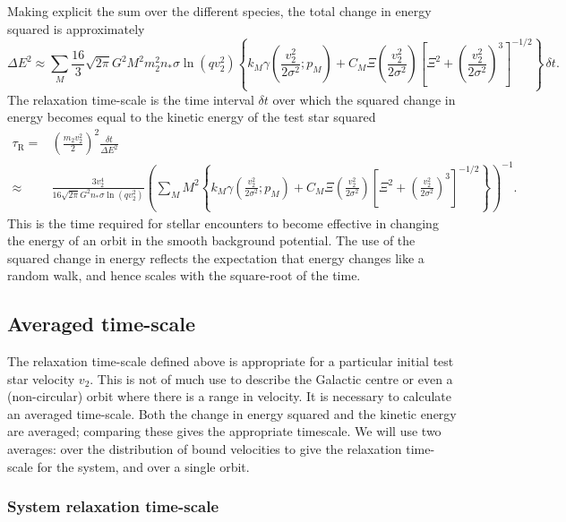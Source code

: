 \documentclass[useAMS,usedcolumn,usegraphicx,usenatbib]{mn2e}
\newcommand{\sub}[1]{\ensuremath{_\mathrm{#1}}}
\begin{document}
\begin{onecolumn}
Making explicit the sum over the different species, the total change in energy squared is approximately
\begin{equation}
\Delta E^2 \approx \sum_M \frac{16}{3}\sqrt{2\pi}G^2 M^2m_2^2n_\ast\sigma\ln\left(qv_2^2\right) \left\{k_M \gamma\left(\frac{v_2^2}{2\sigma^2};p_M\right) + C_M\Xi\left(\frac{v_2^2}{2\sigma^2}\right)\left[\Xi^2 + \left(\frac{v_2^2}{2\sigma^2}\right)^3\right]^{-1/2}\right\}\,\delta t.
\end{equation}
The relaxation time-scale is the time interval $\delta t$ over which the squared change in energy becomes equal to the kinetic energy of the test star squared
\begin{align}
\tau\sub{R} = {} & \left(\frac{m_2v_2^2}{2}\right)^2\frac{\delta t}{\Delta E^2} \\
 \approx {} & \frac{3v_2^4}{16\sqrt{2\pi}G^2n_\ast\sigma\ln\left(qv_2^2\right)} \left(\sum_M M^2 \left\{k_M \gamma\left(\frac{v_2^2}{2\sigma^2};p_M\right) + C_M\Xi\left(\frac{v_2^2}{2\sigma^2}\right)\left[\Xi^2 + \left(\frac{v_2^2}{2\sigma^2}\right)^3\right]^{-1/2}\right\}\right)^{-1}.
\end{align}
This is the time required for stellar encounters to become effective in changing the energy of an orbit in the smooth background potential. The use of the squared change in energy reflects the expectation that energy changes like a random walk, and hence scales with the square-root of the time.

\subsection{Averaged time-scale}

The relaxation time-scale defined above is appropriate for a particular initial test star velocity $v_2$. This is not of much use to describe the Galactic centre or even a (non-circular) orbit where there is a range in velocity. It is necessary to calculate an averaged time-scale. Both the change in energy squared and the kinetic energy are averaged; comparing these gives the appropriate timescale. We will use two averages: over the distribution of bound velocities to give the relaxation time-scale for the system, and over a single orbit.

\subsubsection{System relaxation time-scale}


\end{onecolumn}
\end{document}
